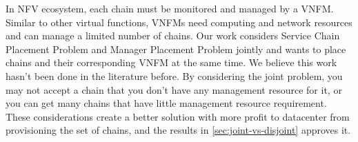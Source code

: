 In NFV ecosystem, each chain must be monitored and managed by a VNFM. Similar to other virtual functions, VNFMs need computing and network resources and  can manage a limited number of chains.
Our work considers Service Chain Placement Problem and Manager Placement Problem jointly and wants to place chains and their corresponding VNFM at the same time.
We believe this work hasn't been done in the literature before.
By considering the joint problem, you may not accept a chain that you don't have any management resource for it,
or you can get many chains that have little management resource requirement.
These considerations create a better solution with more profit to datacenter from provisioning the set of chains,
and the results in \ref{sec:joint-vs-disjoint} approves it.
